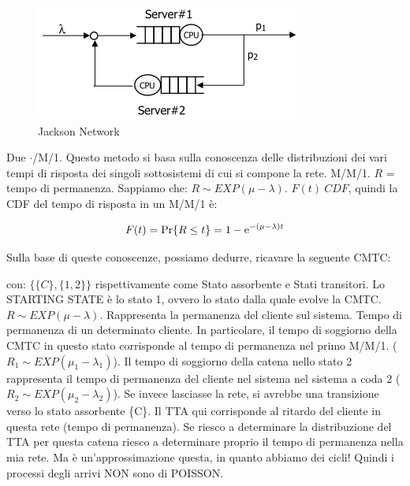 \begin{center}
\begin{figure}[H]
\centering
\includegraphics[scale=1]{figures/ex/jksnet.png}
\caption{Jackson Network}
\end{figure}
\end{center}

Due $\mathord{\cdot}$/M/1. Questo metodo si basa sulla conoscenza delle distribuzioni dei vari tempi di risposta dei singoli sottosistemi di cui si compone la rete. M/M/1. $R$ = tempo di permanenza. Sappiamo che: $R \sim EXP(\mu-\lambda)$. $F(t)\ CDF$, quindi la CDF del tempo di risposta in un M/M/1 è:

\[
	F(t)=\Pr\{R\leq t\} = 1-\mathop{}\!\mathrm{e}^{-(\mu-\lambda)t}
\]

Sulla base di queste conoscenze, possiamo dedurre, ricavare la seguente CMTC:

\begin{center}
\end{center} 

con: $\{\{C\},\{1,2\}\}$ rispettivamente come Stato assorbente e Stati transitori. Lo STARTING STATE è lo stato 1, ovvero lo stato dalla quale evolve la CMTC. $R\sim EXP(\mu-\lambda)$. Rappresenta la permanenza del cliente sul sistema. Tempo di permanenza di un determinato cliente. In particolare, il tempo di soggiorno della CMTC in questo stato corrisponde al tempo di permanenza nel primo M/M/1. ($R_1\sim EXP(\mu_1-\lambda_1)$). Il tempo di soggiorno della catena nello stato 2 rappresenta il tempo di permanenza del cliente nel sistema nel sistema a coda 2 ($R_2\sim EXP(\mu_2-\lambda_2)$). Se invece lasciasse la rete, si avrebbe una transizione verso lo stato assorbente \{C\}. Il TTA qui corrisponde al ritardo del cliente in questa rete (tempo di permanenza). Se riesco a determinare la distribuzione del TTA per questa catena riesco a determinare proprio il tempo di permanenza nella mia rete. Ma è un'approssimazione questa, in quanto abbiamo dei cicli! Quindi i processi degli arrivi NON sono di POISSON. 

